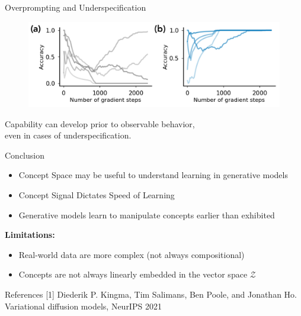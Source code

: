 \begin{frame}[t]{Overprompting and Underspecification}
\begin{figure}
    \centering
    \includegraphics[width=0.65\linewidth]{figures/figure_11.png}
\end{figure}
\qquad Capability can develop prior to observable
behavior, \\ \qquad even in cases of underspecification.
\end{frame}

\begin{frame}{Conclusion}
    \begin{itemize}
        \item Concept Space may be useful to understand learning in generative models
        \item Concept Signal Dictates Speed of Learning
        \item Generative models learn to manipulate concepts earlier than exhibited
    \end{itemize}

\quad \textbf{Limitations:}
\begin{itemize}
    \item Real-world data are more complex (not always compositional)
    \item Concepts are not always linearly embedded in the vector space $\mathcal{Z}$
\end{itemize}
\end{frame}

\begin{frame}{References}
    [1] Diederik P. Kingma, Tim Salimans, Ben Poole, and Jonathan Ho. Variational diffusion models, NeurIPS 2021
    \hfill \break
\end{frame}

